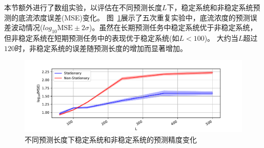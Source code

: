 本节额外进行了数组实验，以评估在不同预测长度$L$下，稳定系统和非稳定系统预测的底流浓度误差(MSE)变化。
图~\ref{fig:length_cmp}展示了五次重复实验中，底流浓度的预测误差波动情况($ log_{10}{\text{MSE}} \pm 2\sigma$)。虽然在长期预测任务中稳定系统优于非稳定系统，但非稳定系统在短期预测任务中的表现优于稳定系统(如$L<100$)。
大约当$L$超过$120$时，非稳定系统的误差随预测长度的增加而显著增加。
\begin{figure}[htpb]
    \centering
    \includegraphics[width=\linewidth,trim=50 0 50 10, clip]{figures/chapter3/length_cmp.pdf}
    \caption{
    不同预测长度下稳定系统和非稳定系统的预测精度变化
    }
    \label{fig:length_cmp}
\end{figure}

